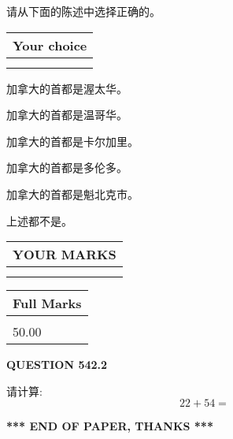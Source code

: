 \documentclass{ctexart}
\begin{document}
  
请从下面的陈述中选择正确的。
  
  
\noindent\hspace{3.0in} \begin{tabular}{|l|}
\hline
Your choice \\
\hline
 \\ 
 \\ 
\hline
\end{tabular}
  
  
 
 
加拿大的首都是渥太华。
 
 
加拿大的首都是温哥华。
 
 
加拿大的首都是卡尔加里。
 
 
加拿大的首都是多伦多。
 
 
加拿大的首都是魁北克市。
 
 
 上述都不是。
 
 
  
\vspace{0.2in}
  
\noindent\begin{tabular}{|l|}
\hline
 YOUR MARKS  \\
\hline
 \\ 
 \\ 
\hline
\end{tabular}
\hspace{0.05in} \begin{tabular}{|l|}
\hline
 Full Marks  \\
\hline
 \\ 
50.00 \\
\hline
\end{tabular}
{\textbf{\Large{QUESTION
542.2 
}}}
  
  
 
请计算:
\begin{equation}
22 +  %
54 = \nonumber
\end{equation}
 

 

 
   
   
 \vspace{0.2in}
 
   
   
   
   
\vspace{1.0in} 
{\textbf{\large{ *** END OF PAPER, THANKS *** }}} 
   
\end{document}

